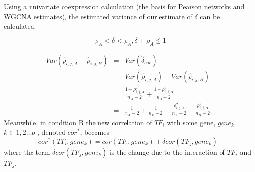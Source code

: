 \documentclass[english]{article}
\begin{document}
Using a univariate coexpression calculation (the basis for Pearson
networks and WGCNA estimates), the estimated variance of our estimate
of $\delta$ can be calculated:

\[
-\rho_{A}<\delta<\rho_{A},\delta+\rho_{A}\le1
\]


\begin{eqnarray*}
Var\left(\hat{\rho}_{i,j,A}-\hat{\rho}_{i,j,B}\right) & = & Var\left(\hat{\delta}_{cor}\right)\\
 &  & Var\left(\hat{\rho}_{i,j,A}\right)+Var\left(\hat{\rho}_{i,j,B}\right)\\
 & = & \frac{1-\rho_{i,j,A}^{2}}{n_{A}-2}+\frac{1-\rho_{i,j,B}^{2}}{n_{B}-2}\\
 & = & \frac{1}{n_{A}-2}+\frac{1}{n_{B}-2}-\frac{\rho_{i,j,A}^{2}}{n_{A}-2}-\frac{\rho_{i,j,B}^{2}}{n_{B}-2}
\end{eqnarray*}
Meanwhile, in condition B the new correlation of $TF_{i}$ with some
gene, $gene_{k}$ $k\in1,2\dots p$ , denoted $cor^{*}$, becomes
\[
cor^{*}\left(TF_{i},gene_{k}\right)=cor\left(TF_{i},gene_{k}\right)+\delta cor\left(TF_{j},gene_{k}\right)
\]
where the term $\delta cor\left(TF_{j},gene_{k}\right)$ is the change
due to the interaction of $TF_{i}$ and $TF_{j}$. 
\end{document}

